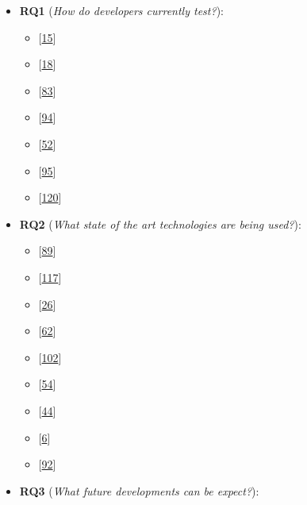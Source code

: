 \documentclass[]{book}
\providecommand{\tightlist}{%
  \setlength{\itemsep}{0pt}\setlength{\parskip}{0pt}}
\begin{document}
\begin{itemize}
\tightlist
\item
  \textbf{RQ1} (\emph{How do developers currently test?}):

  \begin{itemize}
  \tightlist
  \item
    {[}\protect\hyperlink{ref-beller2017developer}{15}{]}
  \item
    {[}\protect\hyperlink{ref-beller2015}{18}{]}
  \item
    {[}\protect\hyperlink{ref-marsavina2014}{83}{]}
  \item
    {[}\protect\hyperlink{ref-pinto2013}{94}{]}
  \item
    {[}\protect\hyperlink{ref-GAROUSI20131354}{52}{]}
  \item
    {[}\protect\hyperlink{ref-pinto2012understanding}{95}{]}
  \item
    {[}\protect\hyperlink{ref-zaidman2011studying}{120}{]}
  \end{itemize}
\item
  \textbf{RQ2} (\emph{What state of the art technologies are being
  used?}):

  \begin{itemize}
  \tightlist
  \item
    {[}\protect\hyperlink{ref-supportingtestsuite}{89}{]}
  \item
    {[}\protect\hyperlink{ref-vernotte2015}{117}{]}
  \item
    {[}\protect\hyperlink{ref-bowring2014obsidian}{26}{]}
  \item
    {[}\protect\hyperlink{ref-hurdugaci2012}{62}{]}
  \item
    {[}\protect\hyperlink{ref-robinson2011}{102}{]}
  \item
    {[}\protect\hyperlink{ref-greiler2013}{54}{]}
  \item
    {[}\protect\hyperlink{ref-dulz2013model}{44}{]}
  \item
    {[}\protect\hyperlink{ref-atifi2017}{6}{]}
  \item
    {[}\protect\hyperlink{ref-noor2015test}{92}{]}
  \end{itemize}
\item
  \textbf{RQ3} (\emph{What future developments can be expect?}):


\end{itemize}
\end{document}
